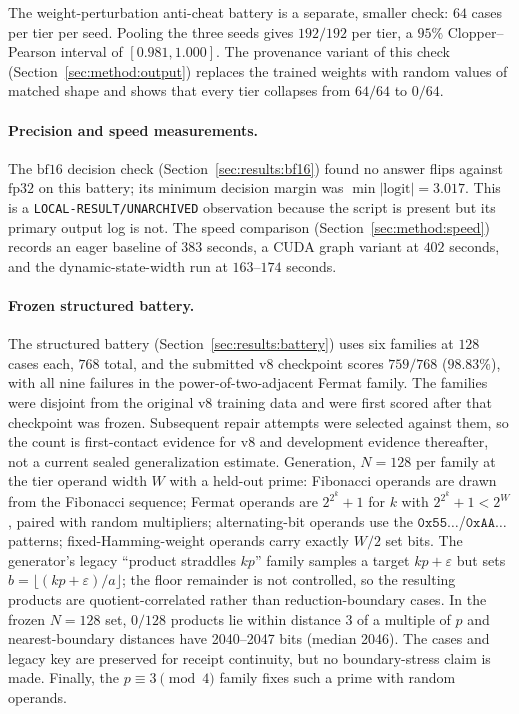 \documentclass[11pt]{article}
\begin{document}
The weight-perturbation anti-cheat battery is a separate, smaller check: $64$ cases per
tier per seed. Pooling the three seeds gives $192/192$ per tier, a $95\%$
Clopper--Pearson interval of $[0.981, 1.000]$. The provenance variant of this check
(Section~\ref{sec:method:output}) replaces the trained weights with random values of
matched shape and shows that every tier collapses from $64/64$ to $0/64$.

\paragraph{Precision and speed measurements.}
The $\mathrm{bf16}$ decision check (Section~\ref{sec:results:bf16}) found no
answer flips against $\mathrm{fp32}$ on this battery; its minimum decision margin
was $\min|\text{logit}| = 3.017$. This is a
\texttt{LOCAL-RESULT/UNARCHIVED} observation because the script is present but
its primary output log is not. The speed comparison
(Section~\ref{sec:method:speed}) records an eager baseline of $383$ seconds, a CUDA
graph variant at $402$ seconds, and the dynamic-state-width run at $163$--$174$
seconds.

\paragraph{Frozen structured battery.}
The structured battery (Section~\ref{sec:results:battery}) uses six families at
$128$ cases each, $768$ total, and the submitted v8 checkpoint scores $759/768$
($98.83\%$), with all nine failures in the power-of-two-adjacent Fermat family.
The families were disjoint from the original v8 training data and were first
scored after that checkpoint was frozen. Subsequent repair attempts were selected
against them, so the count is first-contact evidence for v8 and development
evidence thereafter, not a current sealed generalization estimate.
Generation, $N=128$ per family at the tier operand width $W$ with a held-out prime:
Fibonacci operands are drawn from the Fibonacci sequence; Fermat operands are
$2^{2^k}+1$ for $k$ with $2^{2^k}+1 < 2^{W}$, paired with random multipliers;
alternating-bit operands use the $\texttt{0x55\ldots}$/$\texttt{0xAA\ldots}$ patterns;
fixed-Hamming-weight operands carry exactly $W/2$ set bits. The generator's
legacy ``product straddles $kp$'' family samples a target $kp+\varepsilon$ but sets
$b=\lfloor(kp+\varepsilon)/a\rfloor$; the floor remainder is not controlled, so
the resulting products are quotient-correlated rather than reduction-boundary
cases. In the frozen $N=128$ set, $0/128$ products lie within distance $3$ of a
multiple of $p$ and nearest-boundary distances have 2040--2047 bits (median
2046). The cases and legacy key are preserved for receipt continuity, but no
boundary-stress claim is made. Finally,
the $p\equiv 3\pmod 4$ family fixes such a prime with random operands.
\end{document}
